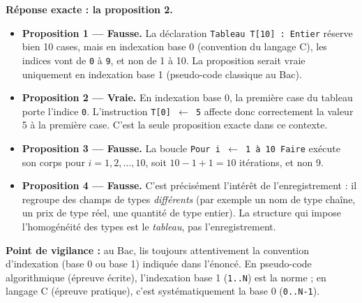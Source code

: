 \documentclass[11pt]{article}
\newcommand{\cle}[1]{{\popxbold\color{popdark}#1}}
\begin{document}
\begin{corrige}
\textbf{Réponse exacte : la proposition 2.}

\begin{itemize}
    \item \textbf{Proposition 1 — Fausse.} La déclaration \texttt{Tableau T[10] : Entier} réserve bien 10 cases, mais en indexation \cle{base 0} (convention du langage C), les indices vont de \texttt{0} à \texttt{9}, et non de 1 à 10. La proposition serait vraie uniquement en indexation base 1 (pseudo-code classique au Bac).
    \item \textbf{Proposition 2 — Vraie.} En indexation base 0, la première case du tableau porte l'indice \texttt{0}. L'instruction \texttt{T[0] $\leftarrow$ 5} affecte donc correctement la valeur 5 à la première case. C'est la seule proposition exacte dans ce contexte.
    \item \textbf{Proposition 3 — Fausse.} La boucle \texttt{Pour i $\leftarrow$ 1 à 10 Faire} exécute son corps pour $i = 1, 2, \dots, 10$, soit $10 - 1 + 1 = 10$ itérations, et non 9.
    \item \textbf{Proposition 4 — Fausse.} C'est précisément l'intérêt de l'\cle{enregistrement} : il regroupe des champs de types \emph{différents} (par exemple un nom de type chaîne, un prix de type réel, une quantité de type entier). La structure qui impose l'homogénéité des types est le \emph{tableau}, pas l'enregistrement.
\end{itemize}

\textbf{Point de vigilance :} au Bac, lis toujours attentivement la convention d'indexation (base 0 ou base 1) indiquée dans l'énoncé. En pseudo-code algorithmique (épreuve écrite), l'indexation base 1 (\texttt{1..N}) est la norme ; en langage C (épreuve pratique), c'est systématiquement la base 0 (\texttt{0..N-1}).
\end{corrige}
\end{document}
